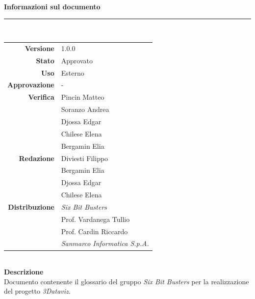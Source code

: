\begin{titlepage}
\begin{center}
	\large \textbf{Informazioni sul documento} \\
	\rule{0.6\textwidth}{0.4pt}
	\\[0.5cm]
	\begin{tabular}{r|l}
		\textbf{Versione} & 1.0.0\\
		\textbf{Stato} & Approvato\\
		\textbf{Uso} & Esterno\\                         
		\textbf{Approvazione} & -\\                      
		\textbf{Verifica} & Pincin Matteo \\ & Soranzo Andrea \\ & Djossa Edgar \\ & Chilese Elena\\ & Bergamin Elia\\                        
		\textbf{Redazione} & Diviesti Filippo\\ & Bergamin Elia \\ & Djossa Edgar\\ & Chilese Elena \\
		\textbf{Distribuzione} & \textit{Six Bit Busters} \\ & Prof. Vardanega Tullio \\ & Prof. Cardin Riccardo \\ & \textit{Sanmarco Informatica S.p.A.}
	\end{tabular}	
	\\[0.8cm]

	\large \textbf{Descrizione} \\
	Documento contenente il glossario del gruppo \textit{Six Bit Busters} per la realizzazione del progetto \textit{3Dataviz}.
	
	\end{center}
\end{titlepage}
